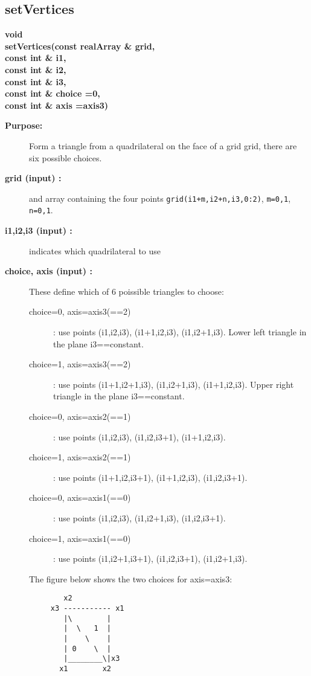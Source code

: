 \subsection{setVertices}
 
\begin{flushleft} \textbf{%
void  \\ 
\settowidth{\TriangleIncludeArgIndent}{setVertices(}%
setVertices(const realArray \& grid, \\ 
\hspace{\TriangleIncludeArgIndent}const int \& i1, \\ 
\hspace{\TriangleIncludeArgIndent}const int \& i2, \\ 
\hspace{\TriangleIncludeArgIndent}const int \& i3, \\ 
\hspace{\TriangleIncludeArgIndent}const int \& choice  =0,\\ 
\hspace{\TriangleIncludeArgIndent}const int \& axis  =axis3)
}\end{flushleft}
\begin{description}
\item[{\bf Purpose:}]  
    Form a triangle from a quadrilateral on the face of a grid grid, 
    there are six possible choices.
\item[{\bf grid (input) :}]  and array containing the four points {\tt grid(i1+m,i2+n,i3,0:2)}, {\tt m=0,1}, {\tt n=0,1}.
\item[{\bf i1,i2,i3 (input) :}]  indicates which quadrilateral to use
\item[{\bf choice, axis (input) :}]  These define which of 6 poissible triangles to choose:
  \begin{description}
    \item[choice=0, axis=axis3(==2)]: use  points (i1,i2,i3), (i1+1,i2,i3), (i1,i2+1,i3). Lower left
              triangle in the plane i3==constant.
    \item[choice=1, axis=axis3(==2)]: use points (i1+1,i2+1,i3), (i1,i2+1,i3), (i1+1,i2,i3). Upper right
              triangle in the plane i3==constant.
    \item[choice=0, axis=axis2(==1)]: use  points (i1,i2,i3), (i1,i2,i3+1), (i1+1,i2,i3).
    \item[choice=1, axis=axis2(==1)]: use points (i1+1,i2,i3+1), (i1+1,i2,i3), (i1,i2,i3+1).
    \item[choice=0, axis=axis1(==0)]: use  points (i1,i2,i3), (i1,i2+1,i3), (i1,i2,i3+1). 
    \item[choice=1, axis=axis1(==0)]: use points (i1,i2+1,i3+1), (i1,i2,i3+1), (i1,i2+1,i3).
   \end{description}
    The figure below shows the two choices for axis=axis3:
 \begin{verbatim}
        x2
     x3 ----------- x1
        |\        |
        |  \   1  |
        |    \    |
        | 0    \  |
        |________\|x3
       x1        x2

 \end{verbatim}
\end{description}
